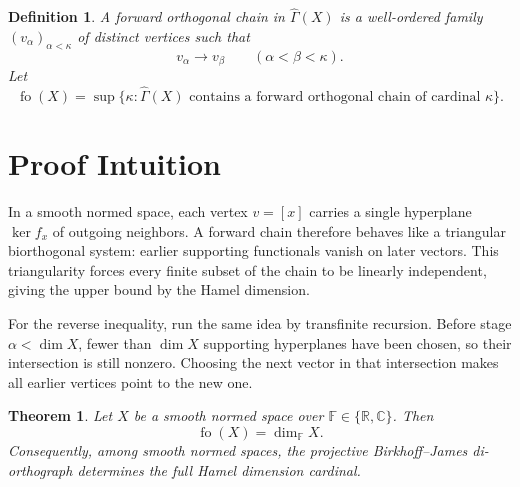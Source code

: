 \documentclass[11pt]{article}
\newtheorem{theorem}{Theorem}
\newtheorem{definition}{Definition}
\newcommand{\F}{\mathbb F}
\newcommand{\R}{\mathbb R}
\newcommand{\C}{\mathbb C}
\newcommand{\Gammahat}{\widehat{\Gamma}}
\begin{document}
\begin{definition}
A \emph{forward orthogonal chain} in \(\Gammahat(X)\) is a well-ordered family
\((v_\alpha)_{\alpha<\kappa}\) of distinct vertices such that
\[
  v_\alpha\to v_\beta \qquad(\alpha<\beta<\kappa).
\]
Let
\[
  \operatorname{fo}(X)
  = \sup\{\kappa:\Gammahat(X)\text{ contains a forward orthogonal chain of
  cardinal }\kappa\}.
\]
\end{definition}

\section*{Proof Intuition}

In a smooth normed space, each vertex \(v=[x]\) carries a single hyperplane
\(\ker f_x\) of outgoing neighbors.  A forward chain therefore behaves like a
triangular biorthogonal system: earlier supporting functionals vanish on later
vectors.  This triangularity forces every finite subset of the chain to be
linearly independent, giving the upper bound by the Hamel dimension.

For the reverse inequality, run the same idea by transfinite recursion.  Before
stage \(\alpha<\dim X\), fewer than \(\dim X\) supporting hyperplanes have been
chosen, so their intersection is still nonzero.  Choosing the next vector in
that intersection makes all earlier vertices point to the new one.

\begin{theorem}
Let \(X\) be a smooth normed space over \(\F\in\{\R,\C\}\).  Then
\[
  \operatorname{fo}(X)=\dim_{\F} X .
\]
Consequently, among smooth normed spaces, the projective Birkhoff--James
di-orthograph determines the full Hamel dimension cardinal.
\end{theorem}
\end{document}
